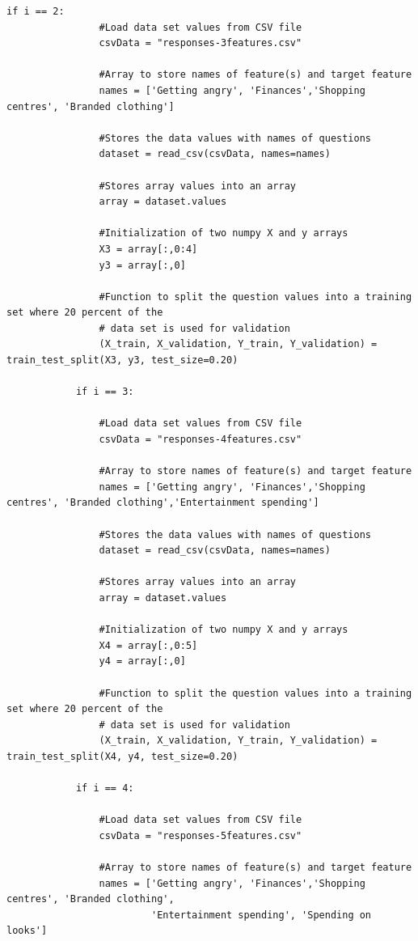 \documentclass[a4paper, 12pt]{article}
\begin{document}
\begin{lstlisting}[frame = single]
            if i == 2:
                #Load data set values from CSV file
                csvData = "responses-3features.csv"    

                #Array to store names of feature(s) and target feature
                names = ['Getting angry', 'Finances','Shopping centres', 'Branded clothing']
    
                #Stores the data values with names of questions
                dataset = read_csv(csvData, names=names)

                #Stores array values into an array
                array = dataset.values

                #Initialization of two numpy X and y arrays
                X3 = array[:,0:4]
                y3 = array[:,0]

                #Function to split the question values into a training set where 20 percent of the 
                # data set is used for validation
                (X_train, X_validation, Y_train, Y_validation) = train_test_split(X3, y3, test_size=0.20)

            if i == 3:

                #Load data set values from CSV file
                csvData = "responses-4features.csv"

                #Array to store names of feature(s) and target feature
                names = ['Getting angry', 'Finances','Shopping centres', 'Branded clothing','Entertainment spending']
    
                #Stores the data values with names of questions
                dataset = read_csv(csvData, names=names)

                #Stores array values into an array
                array = dataset.values

                #Initialization of two numpy X and y arrays
                X4 = array[:,0:5]
                y4 = array[:,0]

                #Function to split the question values into a training set where 20 percent of the 
                # data set is used for validation
                (X_train, X_validation, Y_train, Y_validation) = train_test_split(X4, y4, test_size=0.20)

            if i == 4:

                #Load data set values from CSV file
                csvData = "responses-5features.csv"    

                #Array to store names of feature(s) and target feature
                names = ['Getting angry', 'Finances','Shopping centres', 'Branded clothing',
                         'Entertainment spending', 'Spending on looks']
    

\end{lstlisting}
\end{document}
